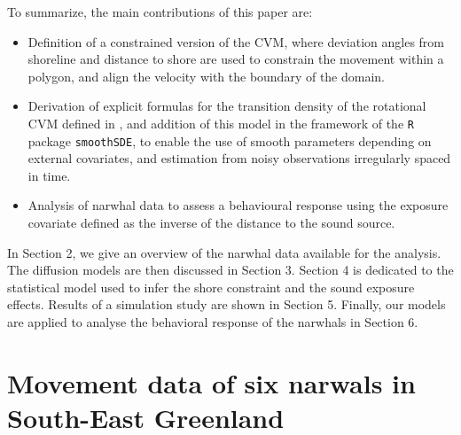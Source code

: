 \documentclass[aoas]{imsart}
\theoremstyle{definition}
\theoremstyle{remark}
\theoremstyle{remark}
\newcommand {\1}{\mathbb{1}}
\begin{document}
To summarize, the main contributions of this paper are:
\begin{itemize}
	\item Definition of a constrained version of the CVM, where deviation angles from shoreline and distance to shore are used to constrain the movement within a polygon, and align the velocity with the boundary of the domain.
	\item Derivation of explicit formulas for the transition density of the rotational CVM defined in \citep{gurarie_correlated_2017}, and addition of this model in the framework of  the \texttt{R} package \texttt{smoothSDE}, to enable the use of smooth parameters depending on external covariates, and estimation from noisy observations irregularly spaced in time.
	\item Analysis of narwhal data to assess a behavioural response using the exposure covariate defined as the inverse of the distance to the sound source.
\end{itemize}

In Section 2, we give an overview of the narwhal data available for the analysis.
The diffusion models are then discussed in Section 3. Section 4 is dedicated to the statistical model used to infer the shore constraint and the sound exposure effects. Results of a simulation study are shown in Section 5. Finally, our models are applied to analyse the behavioral response of the narwhals in Section 6.





\section{Movement data of six narwals in South-East Greenland}
\label{section: movement data}
\end{document}
